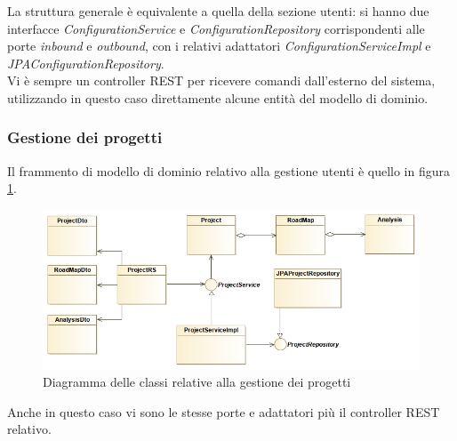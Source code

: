 La struttura generale è equivalente a quella della sezione utenti: si hanno due interfacce \textit{ConfigurationService} e \textit{ConfigurationRepository} corrispondenti alle porte \textit{inbound} e \textit{outbound}, con i relativi adattatori \textit{ConfigurationServiceImpl} e \textit{JPAConfigurationRepository}.\\
Vi è sempre un controller REST per ricevere comandi dall'esterno del sistema, utilizzando in questo caso direttamente alcune entità del modello di dominio.

\subsubsection{Gestione dei progetti}
Il frammento di modello di dominio relativo alla gestione utenti è quello in figura \ref{fig:projects_diagram}.

\begin{figure}[h]
	\centering
	\includegraphics[width=\textwidth]{img/projects_diagram}
	\caption{Diagramma delle classi relative alla gestione dei progetti}
	\label{fig:projects_diagram}
\end{figure}

Anche in questo caso vi sono le stesse porte e adattatori più il controller REST relativo.